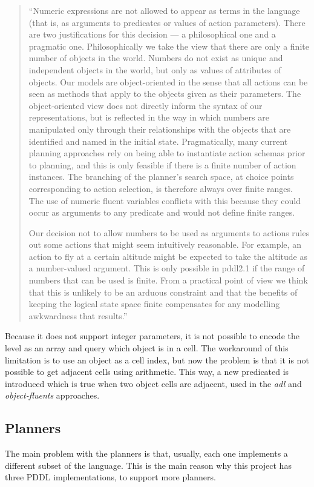 \documentclass{report}
\theoremstyle{plain}
\begin{document}
\begin{quote}
``Numeric expressions are not allowed to appear as terms in the language (that is, as
arguments to predicates or values of action parameters). There are two justifications for
this decision — a philosophical one and a pragmatic one. Philosophically we take the
view that there are only a finite number of objects in the world. Numbers do not exist as
unique and independent objects in the world, but only as values of attributes of objects.
Our models are object-oriented in the sense that all actions can be seen as methods that
apply to the objects given as their parameters. The object-oriented view does not directly
inform the syntax of our representations, but is reflected in the way in which numbers are
manipulated only through their relationships with the objects that are identified and named
in the initial state. Pragmatically, many current planning approaches rely on being able
to instantiate action schemas prior to planning, and this is only feasible if there is a finite
number of action instances. The branching of the planner’s search space, at choice points
corresponding to action selection, is therefore always over finite ranges. The use of numeric
fluent variables conflicts with this because they could occur as arguments to any predicate
and would not define finite ranges.

Our decision not to allow numbers to be used as arguments to actions rules out some
actions that might seem intuitively reasonable. For example, an action to fly at a certain
altitude might be expected to take the altitude as a number-valued argument. This is only
possible in pddl2.1 if the range of numbers that can be used is finite. From a practical
point of view we think that this is unlikely to be an arduous constraint and that the benefits
of keeping the logical state space finite compensates for any modelling awkwardness that
results.''
\end{quote}

Because it does not support integer parameters, it is not possible to encode the level as an array and query which object is in a cell. The workaround of this limitation is to use an object as a cell index, but now the problem is that it is not possible to get adjacent cells using arithmetic. This way, a new predicated is introduced which is true when two object cells are adjacent, used in the \emph{adl} and \emph{object-fluents} approaches.

\subsection{Planners}
The main problem with the planners is that, usually, each one implements a different subset of the language. This is the main reason why this project has three PDDL implementations, to support more planners.
\end{document}

